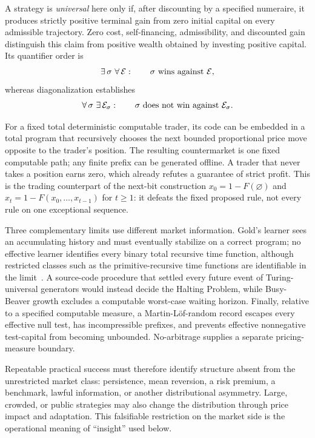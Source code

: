 \documentclass[aps,pra,reprint,superscriptaddress,amsmath,amssymb,floatfix]{revtex4-2}
\theoremstyle{plain}
\theoremstyle{definition}
\theoremstyle{remark}
\begin{document}
A strategy is \emph{universal} here only if, after discounting by a specified
numeraire, it produces strictly positive terminal gain from zero initial
capital on every admissible trajectory. Zero cost, self-financing,
admissibility, and discounted gain distinguish this claim from positive wealth
obtained by investing positive capital. Its quantifier order is
\begin{equation}
  \exists\,\sigma\ \forall\,\mathcal E:
  \qquad \sigma\ \hbox{wins against }\mathcal E,
  \label{eq:universalquantifiers}
\end{equation}
whereas diagonalization establishes
\begin{equation}
  \forall\,\sigma\ \exists\,\mathcal E_\sigma:
  \qquad \sigma\ \hbox{does not win against }\mathcal E_\sigma.
  \label{eq:counterquantifiers}
\end{equation}

For a fixed total deterministic computable trader, its code can be embedded in
a total program that recursively chooses the next bounded proportional price
move opposite to the trader's position. The resulting countermarket is one
fixed computable path; any finite prefix can be generated offline. A trader that
never takes a position earns zero, which already refutes a guarantee of strict
profit. This is the trading counterpart of the next-bit construction
\(x_0=1-F(\varnothing)\) and
\(x_t=1-F(x_0,\ldots,x_{t-1})\) for \(t\geq1\): it defeats the fixed proposed
rule, not every rule on one exceptional sequence.

Three complementary limits use different market information. Gold's learner
sees an accumulating history and must eventually stabilize on a correct
program; no effective learner identifies every binary total recursive time
function, although restricted classes such as the primitive-recursive time
functions are identifiable in the limit~\cite{go-65,go-67}. A source-code
procedure that settled every future event of Turing-universal generators would
instead decide the Halting Problem, while Busy-Beaver growth excludes a
computable worst-case waiting horizon. Finally, relative to a specified
computable measure, a Martin-L\"of-random record escapes every effective null
test, has incompressible prefixes, and prevents effective nonnegative
test-capital from becoming unbounded. No-arbitrage supplies a separate
pricing-measure boundary.

Repeatable practical success must therefore identify structure absent from the
unrestricted market class: persistence, mean reversion, a risk premium, a
benchmark, lawful information, or another distributional asymmetry. Large,
crowded, or public strategies may also change the distribution through price
impact and adaptation. This falsifiable restriction on the market side is the
operational meaning of ``insight'' used below.
\end{document}

